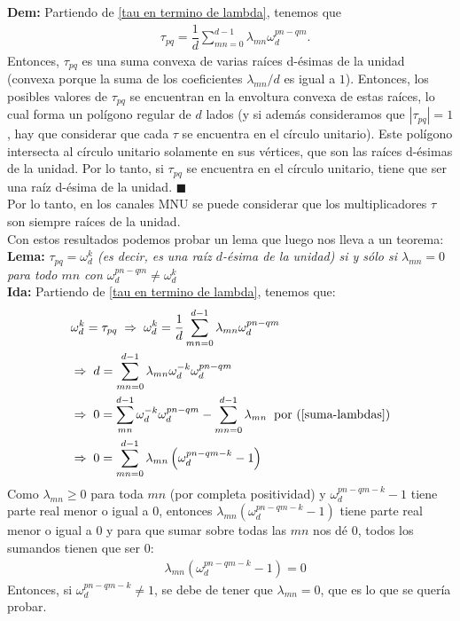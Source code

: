 \textbf{Dem:} Partiendo de \ref{tau en termino de lambda}, tenemos que
\begin{align*}
& \tau_{pq} = \dfrac{1}{d} \sum_{mn=0}^{d-1} \lambda_{mn} \omega_d^{pn-qm} .
\end{align*}
Entonces, $\tau_{pq}$ es una suma convexa de varias raíces d-ésimas 
de la unidad (convexa porque la suma de los coeficientes $\lambda_{mn}/d$ es igual a $1$). 
Entonces, los posibles valores de $\tau_{pq}$ se encuentran 
en la envoltura convexa de estas raíces,
 lo cual forma un polígono regular de $d$ lados (y si además consideramos que $|\tau_{pq}|=1$, hay que considerar que cada $\tau$ se encuentra en el círculo unitario).
Este polígono intersecta al círculo unitario solamente en sus vértices,
 que son las raíces d-ésimas de la unidad.
 Por lo tanto, si $\tau_{pq}$ se encuentra en el círculo unitario, 
tiene que ser una raíz d-ésima de la unidad.  $ \blacksquare$  \\

Por lo tanto, en los canales MNU se puede considerar 
que los multiplicadores $\tau$ son siempre raíces de la unidad. \\

Con estos resultados podemos probar un lema que luego nos lleva a un teorema:\\




\textbf{Lema:} \textit{$\tau_{pq} = \omega_d^k$ (es decir, es una raíz $d$-ésima de la unidad) si  y sólo si $\lambda_{mn} = 0$ para todo $mn$ con $\omega_d^{pn-qm} \neq \omega_d^k$} \\

\textbf{Ida:}  Partiendo de \ref{tau en termino de lambda}, tenemos que:
\begin{align*}
& \omega_d^k = \tau_{pq}  \; \Rightarrow \; \omega_d^k = \dfrac{1}{d} \sum_{mn=0}^{d-1} \lambda_{mn} \omega_d^{pn-qm} \\
& \Rightarrow \; d = \sum_{mn=0}^{d-1} \lambda_{mn} \omega_d^{-k} \omega_d^{pn-qm} \\
& \Rightarrow \; 0 = \sum_{mn}^{d-1} \omega_d^{-k} \omega_d^{pn-qm} - \sum_{mn=0}^{d-1}\lambda_{mn} \;\; \text{por (\ref{suma-lambdas})} \\
& \Rightarrow \; 0 = \sum_{mn=0}^{d-1} \lambda_{mn} \left( \omega_d^{pn-qm-k} - 1 \right) 
\end{align*}
Como $\lambda_{mn} \geq 0$ para toda $mn$ (por completa positividad) y $\omega_d^{pn-qm-k} - 1$ tiene parte real menor o igual a $0$, entonces $\lambda_{mn} \left( \omega_d^{pn-qm-k} - 1 \right) $ tiene parte real menor o igual a $0$ y para que sumar sobre todas las $mn$ nos dé $0$, todos los sumandos tienen que ser $0$:
\begin{align*}
& \lambda_{mn} \left( \omega_d^{pn-qm-k} - 1 \right) = 0
\end{align*}
Entonces, si $\omega_d^{pn-qm-k} \neq 1$, se debe de tener que $\lambda_{mn} = 0$, que es lo que se quería probar. \\

